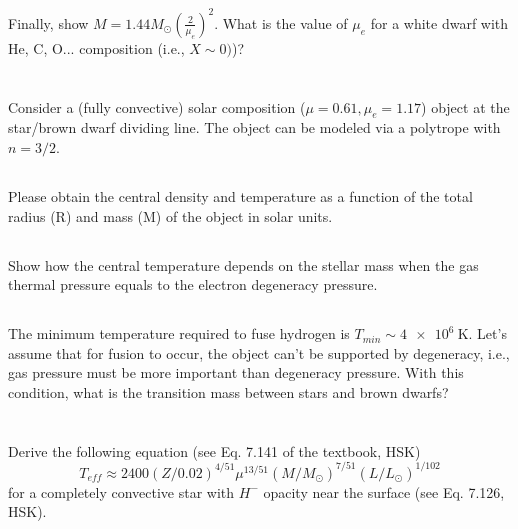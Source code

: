 \subsection{}
Finally, show $M=1.44M_\odot\left(\frac{2}{\mu_e}\right)^2$. What is the value of $\mu_e$ for a white dwarf with He, C, O... composition (i.e., $X\sim0)$)?



\section{}
Consider a (fully convective) solar composition ($\mu = 0.61, \mu_e = 1.17$) object at the
star/brown dwarf dividing line. The object can be modeled via a polytrope with
$n = 3/2$.

\subsection{}
Please obtain the central density and temperature as a function of the total
radius (R) and mass (M) of the object in solar units.

\subsection{}
Show how the central temperature depends on the stellar mass when the gas
thermal pressure equals to the electron degeneracy pressure.

\subsection{}
The minimum temperature required to fuse hydrogen is $T_{min}\sim\SI{4e6}{\kelvin}$. Let's
assume that for fusion to occur, the object can't be supported by degeneracy,
i.e., gas pressure must be more important than degeneracy pressure. 
With this condition, what is the transition mass between stars and brown dwarfs?


\section{}
Derive the following equation (see Eq. 7.141 of the textbook, HSK)
\begin{equation}
    T_{eff}\approx 2400(Z/0.02)^{4/51}\mu^{13/51}(M/M_\odot)^{7/51}(L/L_\odot)^{1/102}
\end{equation}
for a completely convective star with $H^{-}$ opacity near the surface (see Eq. 7.126, HSK).



